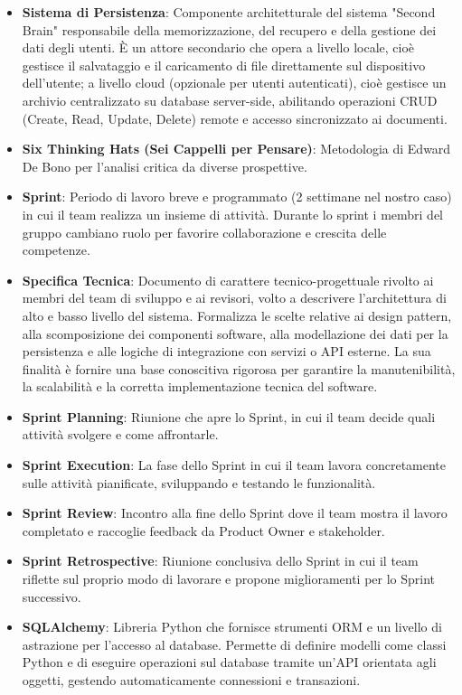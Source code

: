 \documentclass[11pt,a4paper]{article}
\begin{document}
\begin{itemize}
\item \textbf{Sistema di Persistenza}: Componente architetturale del sistema "Second Brain" responsabile della memorizzazione, del recupero e della gestione dei dati degli utenti. È un attore secondario che opera a livello locale, cioè gestisce il salvataggio e il caricamento di file direttamente sul dispositivo dell'utente; a livello cloud (opzionale per utenti autenticati), cioè gestisce un archivio centralizzato su database server-side, abilitando operazioni CRUD (Create, Read, Update, Delete) remote e accesso sincronizzato ai documenti.

\item \textbf{Six Thinking Hats (Sei Cappelli per Pensare)}: Metodologia di Edward De Bono per l'analisi critica da diverse prospettive.
\item \textbf{Sprint}: Periodo di lavoro breve e programmato (2 settimane nel nostro caso) in cui il team realizza un insieme di attività. Durante lo sprint i membri del gruppo cambiano ruolo per favorire collaborazione e crescita delle competenze.

\item \textbf{Specifica Tecnica}: Documento di carattere tecnico-progettuale rivolto ai membri del team di sviluppo e ai revisori, volto a descrivere l'architettura di alto e basso livello del sistema. Formalizza le scelte relative ai design pattern, alla scomposizione dei componenti software, alla modellazione dei dati per la persistenza e alle logiche di 
integrazione con servizi o API esterne. La sua finalità è fornire una base conoscitiva rigorosa per garantire la manutenibilità, la scalabilità e la corretta implementazione tecnica del software.

\item \textbf{Sprint Planning}: Riunione che apre lo Sprint, in cui il team decide quali attività svolgere e come affrontarle.
\item \textbf{Sprint Execution}: La fase dello Sprint in cui il team lavora concretamente sulle attività pianificate, sviluppando e testando le funzionalità.
\item \textbf{Sprint Review}: Incontro alla fine dello Sprint dove il team mostra il lavoro completato e raccoglie feedback da Product Owner e stakeholder.
\item \textbf{Sprint Retrospective}: Riunione conclusiva dello Sprint in cui il team riflette sul proprio modo di lavorare e propone miglioramenti per lo Sprint successivo.

\item \textbf{SQLAlchemy}: Libreria Python che fornisce strumenti ORM 
e un livello di astrazione per l'accesso al database. Permette 
di definire modelli come classi Python e di eseguire operazioni 
sul database tramite un'API orientata agli oggetti, gestendo 
automaticamente connessioni e transazioni.
\end{itemize}
\end{document}

